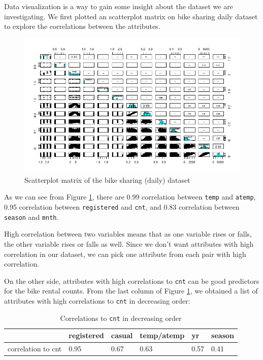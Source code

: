 \documentclass[12pt]{article}
\begin{document}
	Data visualization is a way to gain some insight about the dataset we are investigating. We first plotted an scatterplot matrix on bike sharing daily dataset to explore the correlations between the attributes.
	\begin{figure}[H]
		\includegraphics[scale=0.6]{figures/scatterplot.png}
		\caption{Scatterplot matrix of the bike sharing (daily) dataset}
		\label{fig:scatterplot}
	\end{figure}
	
	As we can see from Figure \ref{fig:scatterplot}, there are 0.99 correlation between \texttt{temp} and \texttt{atemp}, 0.95 correlation between \texttt{registered} and \texttt{cnt}, and 0.83 correlation between \texttt{season} and \texttt{mnth}.
	
	High correlation between two variables means that as one variable rises or falls, the other variable rises or falls as well. Since we don't want attributes with high correlation in our dataset, we can pick one attribute from each pair with high correlation.
	
	On the other side, attributes with high correlations to \texttt{cnt} can be good predictors for the bike rental counts. From the last column of Figure \ref{fig:scatterplot}, we obtained a list of attributes with high correlations to \texttt{cnt} in decreasing order: 
	\begin{table}[H]
		\centering
		\begin{tabular}{| l | l | l | l | l | l|}
			\hline
			& registered & casual & temp/atemp & yr & season\\
			\hline
			 correlation to cnt& 0.95 & 0.67 & 0.63 & 0.57 & 0.41\\
			\hline
		\end{tabular}
		\caption{Correlations to \texttt{cnt} in decreasing order}
	\end{table}
	
\end{document}
